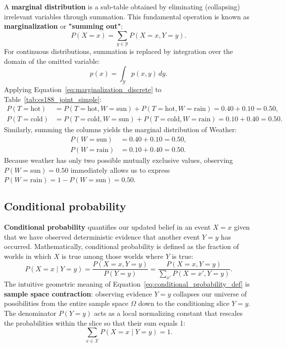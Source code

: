 A \textbf{marginal distribution} is a sub-table obtained by eliminating (collapsing) irrelevant variables through summation. This fundamental operation is known as \textbf{marginalization} or \textbf{"summing out"}:
\begin{equation}
P(X = x) = \sum_{y \in \mathcal{Y}} P(X = x, Y = y).
\label{eq:marginalization_discrete}
\end{equation}
For continuous distributions, summation is replaced by integration over the domain of the omitted variable:
\begin{equation}
p(x) = \int_{\mathcal{Y}} p(x, y) \, dy.
\label{eq:marginalization_continuous}
\end{equation}
Applying Equation~\eqref{eq:marginalization_discrete} to Table~\ref{tab:cs188_joint_simple}:
\begin{align}
P(T = \text{hot}) &= P(T=\text{hot}, W=\text{sun}) + P(T=\text{hot}, W=\text{rain}) = 0.40 + 0.10 = 0.50, \\
P(T = \text{cold}) &= P(T=\text{cold}, W=\text{sun}) + P(T=\text{cold}, W=\text{rain}) = 0.10 + 0.40 = 0.50.
\end{align}
Similarly, summing the columns yields the marginal distribution of Weather:
\begin{align}
P(W = \text{sun}) &= 0.40 + 0.10 = 0.50, \\
P(W = \text{rain}) &= 0.10 + 0.40 = 0.50.
\end{align}
Because weather has only two possible mutually exclusive values, observing $P(W = \text{sun}) = 0.50$ immediately allows us to express $P(W = \text{rain}) = 1 - P(W = \text{sun}) = 0.50$.

\subsection{Conditional probability}
\label{sec:conditional_probabilities}

\textbf{Conditional probability} quantifies our updated belief in an event $X = x$ given that we have observed deterministic evidence that another event $Y = y$ has occurred. Mathematically, conditional probability is defined as the fraction of worlds in which $X$ is true among those worlds where $Y$ is true:
\begin{equation}
P(X = x \mid Y = y) = \frac{P(X = x, Y = y)}{P(Y = y)} = \frac{P(X = x, Y = y)}{\sum_{x'} P(X = x', Y = y)}.
\label{eq:conditional_probability_def}
\end{equation}
The intuitive geometric meaning of Equation~\eqref{eq:conditional_probability_def} is \textbf{sample space contraction}: observing evidence $Y = y$ collapses our universe of possibilities from the entire sample space $\Omega$ down to the conditioning slice $Y = y$. The denominator $P(Y = y)$ acts as a local normalizing constant that rescales the probabilities within the slice so that their sum equals 1:
\begin{equation}
\sum_{x \in \mathcal{X}} P(X = x \mid Y = y) = 1.
\end{equation}

